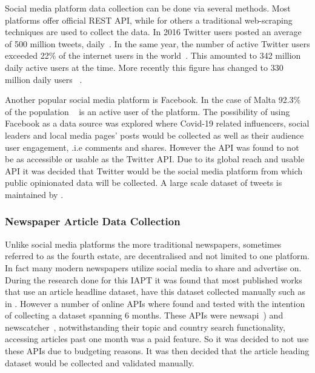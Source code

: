 Social media platform data collection can be done via several methods.
Most platforms offer official \ac{REST} \ac{API}, while for others a traditional web-scraping techniques are used to collect the data.
In 2016 Twitter users posted an average of 500 million tweets, daily~\citep{Crannell2016}.
In the same year, the number of active Twitter users exceeded 22\% of the internet users in the world~\citep{Kayser2016}.
This amounted to 342 million daily active users at the time.
More recently this figure has changed to 330 million daily users ~\citep{tankovska_2021}.

Another popular social media platform is Facebook.
In the case of Malta 92.3\% of the population ~\citep{napoleoncat} is an active user of the platform.
The possibility of using Facebook as a data source was explored where Covid-19 related influencers, social leaders and local media pages' posts would be collected as well as their audience user engagement, .i.e comments and shares.
However the \ac{API} was found to not be as accessible or usable as the Twitter \ac{API}.
Due to its global reach and usable \ac{API} it was decided that Twitter would be the social media platform from which public opinionated data will be collected.
A large scale dataset of tweets is maintained by \citet{banda2020largescale}.

\subsubsection{Newspaper Article Data Collection}

Unlike social media platforms the more traditional newspapers, sometimes referred to as the fourth estate, are decentralised and not limited to one platform.
In fact many modern newspapers utilize social media to share and advertise on.
During the research done for this \ac{IAPT} it was found that most published works that use an article headline dataset, have this dataset collected manually such as in \citet{newspaper_headlines}.
However a number of online \ac{API}s where found and tested with the intention of collecting a dataset spanning 6 months.
These \ac{API}s were newsapi~\citep{newsapi}) and newscatcher~\citep{newscatcher}, notwithstanding their topic and country search functionality, accessing articles past one month was a paid feature.
So it was decided to not use these \ac{API}s due to budgeting reasons.
It was then decided that the article heading dataset would be collected and validated manually.

